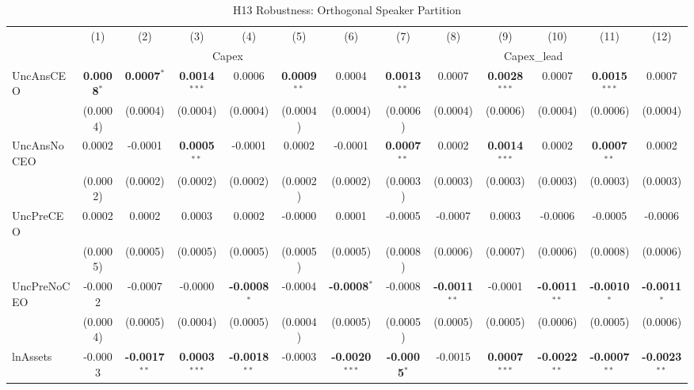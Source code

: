 \begin{landscape}
\begin{table}[H]
\setlength{\tabcolsep}{3pt}
\renewcommand{\arraystretch}{0.85}
\centering
\caption{H13 Robustness: Orthogonal Speaker Partition}
\label{tab:h13_robust}
\scriptsize
\begin{tabular}{lcccccccccccc}
\toprule
 & (1) & (2) & (3) & (4) & (5) & (6) & (7) & (8) & (9) & (10) & (11) & (12) \\
 & \multicolumn{6}{c}{Capex} & \multicolumn{6}{c}{Capex\_lead} \\
\cmidrule(lr){2-7} \cmidrule(lr){8-13}
\midrule
UncAnsCEO & \textbf{0.0008}$^{*}$ & \textbf{0.0007}$^{*}$ & \textbf{0.0014}$^{***}$ & 0.0006 & \textbf{0.0009}$^{**}$ & 0.0004 & \textbf{0.0013}$^{**}$ & 0.0007 & \textbf{0.0028}$^{***}$ & 0.0007 & \textbf{0.0015}$^{***}$ & 0.0007 \\
 & (0.0004) & (0.0004) & (0.0004) & (0.0004) & (0.0004) & (0.0004) & (0.0006) & (0.0004) & (0.0006) & (0.0004) & (0.0006) & (0.0004) \\
UncAnsNoCEO & 0.0002 & -0.0001 & \textbf{0.0005}$^{**}$ & -0.0001 & 0.0002 & -0.0001 & \textbf{0.0007}$^{**}$ & 0.0002 & \textbf{0.0014}$^{***}$ & 0.0002 & \textbf{0.0007}$^{**}$ & 0.0002 \\
 & (0.0002) & (0.0002) & (0.0002) & (0.0002) & (0.0002) & (0.0002) & (0.0003) & (0.0003) & (0.0003) & (0.0003) & (0.0003) & (0.0003) \\
UncPreCEO & 0.0002 & 0.0002 & 0.0003 & 0.0002 & -0.0000 & 0.0001 & -0.0005 & -0.0007 & 0.0003 & -0.0006 & -0.0005 & -0.0006 \\
 & (0.0005) & (0.0005) & (0.0005) & (0.0005) & (0.0005) & (0.0005) & (0.0008) & (0.0006) & (0.0007) & (0.0006) & (0.0008) & (0.0006) \\
UncPreNoCEO & -0.0002 & -0.0007 & -0.0000 & \textbf{-0.0008}$^{*}$ & -0.0004 & \textbf{-0.0008}$^{*}$ & -0.0008 & \textbf{-0.0011}$^{**}$ & -0.0001 & \textbf{-0.0011}$^{**}$ & \textbf{-0.0010}$^{*}$ & \textbf{-0.0011}$^{*}$ \\
 & (0.0004) & (0.0005) & (0.0004) & (0.0005) & (0.0004) & (0.0005) & (0.0005) & (0.0005) & (0.0005) & (0.0006) & (0.0005) & (0.0006) \\
\midrule
lnAssets & -0.0003 & \textbf{-0.0017}$^{**}$ & \textbf{0.0003}$^{***}$ & \textbf{-0.0018}$^{**}$ & -0.0003 & \textbf{-0.0020}$^{***}$ & \textbf{-0.0005}$^{*}$ & -0.0015 & \textbf{0.0007}$^{***}$ & \textbf{-0.0022}$^{**}$ & \textbf{-0.0007}$^{**}$ & \textbf{-0.0023}$^{**}$ \\

\end{tabular}
\end{table}
\end{landscape}
